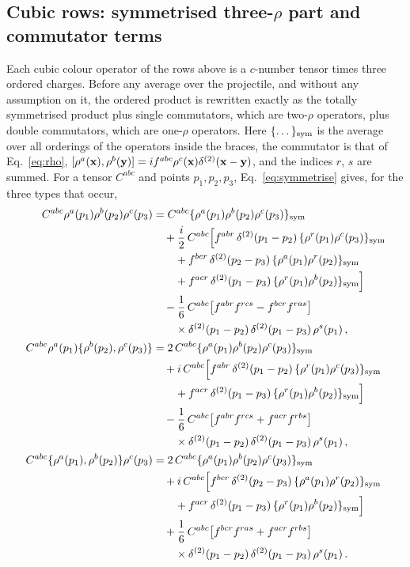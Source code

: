 \subsection{Cubic rows: symmetrised three-\texorpdfstring{$\rho$}{rho} part and commutator terms}\label{app:fin_sym}

Each cubic colour operator of the rows above is a $c$-number tensor times three ordered charges. Before any average over the projectile, and without any assumption on it, the ordered product is rewritten exactly as the totally symmetrised product plus single commutators, which are two-$\rho$ operators, plus double commutators, which are one-$\rho$ operators. Here $\{\dots\}_{\rm sym}$ is the average over all orderings of the operators inside the braces, the commutator is that of Eq.~\eqref{eq:rho}, $[\rho^a(\mathbf{x}),\rho^b(\mathbf{y})]=if^{abc}\rho^c(\mathbf{x})\delta^{(2)}(\mathbf{x}-\mathbf{y})$, and the indices $r$, $s$ are summed. For a tensor $C^{abc}$ and points $p_1,p_2,p_3$, Eq.~\eqref{eq:symmetrise} gives, for the three types that occur,
\begin{align}\label{eq:app_symord}
C^{abc}\rho^a(p_1)\rho^b(p_2)\rho^c(p_3)&=C^{abc}\{\rho^a(p_1)\rho^b(p_2)\rho^c(p_3)\}_{\rm sym}\notag\\
&\quad+\frac i2\,C^{abc}\Big[f^{abr}\,\delta^{(2)}(p_1-p_2)\,\{\rho^r(p_1)\rho^c(p_3)\}_{\rm sym}\notag\\
&\qquad+f^{bcr}\,\delta^{(2)}(p_2-p_3)\,\{\rho^a(p_1)\rho^r(p_2)\}_{\rm sym}\notag\\
&\qquad+f^{acr}\,\delta^{(2)}(p_1-p_3)\,\{\rho^r(p_1)\rho^b(p_2)\}_{\rm sym}\Big]\notag\\
&\quad-\frac16\,C^{abc}\big[f^{abr}f^{rcs}-f^{bcr}f^{ras}\big]\notag\\
&\qquad\times\delta^{(2)}(p_1-p_2)\,\delta^{(2)}(p_1-p_3)\,\rho^s(p_1)\,,\\
\label{eq:app_syma23}
C^{abc}\rho^a(p_1)\{\rho^b(p_2),\rho^c(p_3)\}&=2\,C^{abc}\{\rho^a(p_1)\rho^b(p_2)\rho^c(p_3)\}_{\rm sym}\notag\\
&\quad+i\,C^{abc}\Big[f^{abr}\,\delta^{(2)}(p_1-p_2)\,\{\rho^r(p_1)\rho^c(p_3)\}_{\rm sym}\notag\\
&\qquad+f^{acr}\,\delta^{(2)}(p_1-p_3)\,\{\rho^r(p_1)\rho^b(p_2)\}_{\rm sym}\Big]\notag\\
&\quad-\frac16\,C^{abc}\big[f^{abr}f^{rcs}+f^{acr}f^{rbs}\big]\notag\\
&\qquad\times\delta^{(2)}(p_1-p_2)\,\delta^{(2)}(p_1-p_3)\,\rho^s(p_1)\,,\\
\label{eq:app_syma12}
C^{abc}\{\rho^a(p_1),\rho^b(p_2)\}\rho^c(p_3)&=2\,C^{abc}\{\rho^a(p_1)\rho^b(p_2)\rho^c(p_3)\}_{\rm sym}\notag\\
&\quad+i\,C^{abc}\Big[f^{bcr}\,\delta^{(2)}(p_2-p_3)\,\{\rho^a(p_1)\rho^r(p_2)\}_{\rm sym}\notag\\
&\qquad+f^{acr}\,\delta^{(2)}(p_1-p_3)\,\{\rho^r(p_1)\rho^b(p_2)\}_{\rm sym}\Big]\notag\\
&\quad+\frac16\,C^{abc}\big[f^{bcr}f^{ras}+f^{acr}f^{rbs}\big]\notag\\
&\qquad\times\delta^{(2)}(p_1-p_2)\,\delta^{(2)}(p_1-p_3)\,\rho^s(p_1)\,.
\end{align}
